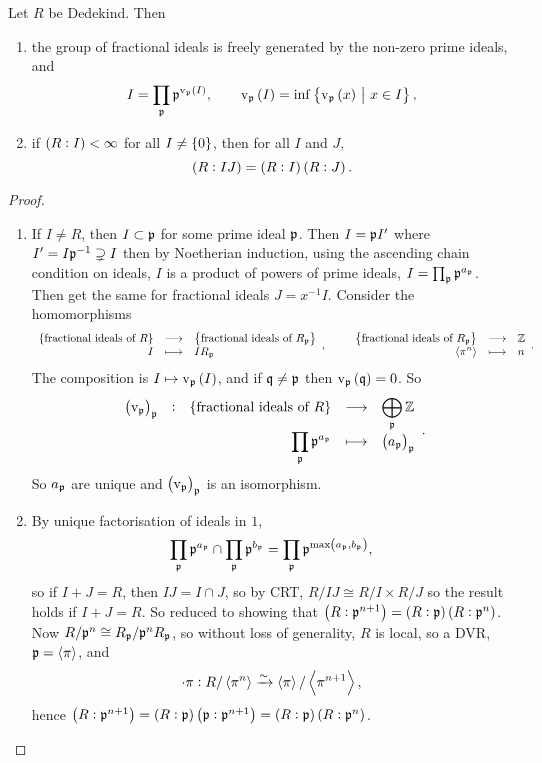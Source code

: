 \begin{theorem}
Let $ R $ be Dedekind. Then
\begin{enumerate}
\item the group of fractional ideals is freely generated by the non-zero prime ideals, and
$$ I = \prod_\ppp \ppp^{\v_\ppp\br{I}}, \qquad \v_\ppp\br{I} = \inf \cbr{\v_\ppp\br{x} \st x \in I}, $$
\item if $ \br{R : I} < \infty $ for all $ I \ne \cbr{0} $, then for all $ I $ and $ J $,
$$ \br{R : IJ} = \br{R : I}\br{R : J}. $$
\end{enumerate}
\end{theorem}

\begin{proof}
\hfill
\begin{enumerate}
\item If $ I \ne R $, then $ I \subset \mathfrak{p} $ for some prime ideal $ \mathfrak{p} $. Then $ I = \mathfrak{p} I' $ where $ I' = I\mathfrak{p}^{-1} \supsetneq I $ then by Noetherian induction, using the ascending chain condition on ideals, $ I $ is a product of powers of prime ideals, $ I = \prod_{\mathfrak{p}} \mathfrak{p}^{a_{\mathfrak{p}}} $. Then get the same for fractional ideals $ J = x^{-1}I $. Consider the homomorphisms
$$ \function{\cbr{\text{fractional ideals of} \ R}}{\cbr{\text{fractional ideals of} \ R_\ppp}}{I}{IR_\ppp}, \qquad \function{\cbr{\text{fractional ideals of} \ R_\ppp}}{\ZZ}{\abr{\pi^n}}{n}. $$
The composition is $ I \mapsto \v_\ppp\br{I} $, and if $ \mathfrak{q} \ne \mathfrak{p} $ then $ \v_\ppp\br{\qqq} = 0 $. So
$$ \function[\br{\v_\ppp}_\ppp]{\cbr{\text{fractional ideals of} \ R}}{\bigoplus_\ppp \ZZ}{\prod_\ppp \ppp^{a_\ppp}}{\br{a_\ppp}_\ppp}. $$
So $ a_{\mathfrak{p}} $ are unique and $ \br{\v_\ppp}_\ppp $ is an isomorphism.


\item By unique factorisation of ideals in $ 1 $,
$$ \prod_\ppp \ppp^{a_\ppp} \cap \prod_\ppp \ppp^{b_\ppp} = \prod_\ppp \ppp^{\max\br{a_\ppp, b_\ppp}}, $$
so if $ I + J = R $, then $ IJ = I \cap J $, so by CRT, $ R / IJ \cong R / I \times R / J $ so the result holds if $ I + J = R $. So reduced to showing that $ \br{R : \ppp^{n + 1}} = \br{R : \ppp}\br{R : \ppp^n} $. Now $ R / \mathfrak{p}^n \cong R_{\mathfrak{p}} / \mathfrak{p}^nR_{\mathfrak{p}} $, so without loss of generality, $ R $ is local, so a DVR, $ \mathfrak{p} = \left\langle \pi \right\rangle $, and
$$ \cdot \pi : R / \left\langle \pi^n \right\rangle \xrightarrow{\sim} \left\langle \pi \right\rangle / \left\langle \pi^{n + 1} \right\rangle, $$
hence $ \br{R : \ppp^{n + 1}} = \br{R : \ppp}\br{\ppp : \ppp^{n + 1}} = \br{R : \ppp}\br{R : \ppp^n} $.
\end{enumerate}
\end{proof}

